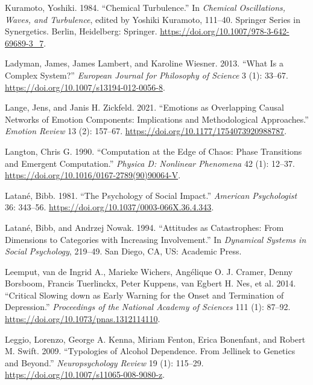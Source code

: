 \documentclass[
  a4paper,
  DIV=11,
  numbers=noendperiod,
  oneside]{scrreprt}
\newlength{\cslhangindent}
\newlength{\cslentryspacingunit} %
\newenvironment{CSLReferences}[2] %
 {%
  \setlength{\parindent}{0pt}
  \ifodd #1
  \let\oldpar\par
  \def\par{\hangindent=\cslhangindent\oldpar}
  \fi
  \setlength{\parskip}{#2\cslentryspacingunit}
 }%
 {}
\begin{document}
\begin{CSLReferences}{1}{0}
\leavevmode{}%
Kuramoto, Yoshiki. 1984. {``Chemical {Turbulence}.''} In \emph{Chemical
{Oscillations}, {Waves}, and {Turbulence}}, edited by Yoshiki Kuramoto,
111--40. Springer {Series} in {Synergetics}. {Berlin, Heidelberg}:
{Springer}. \url{https://doi.org/10.1007/978-3-642-69689-3_7}.

\leavevmode{}%
Ladyman, James, James Lambert, and Karoline Wiesner. 2013. {``What Is a
Complex System?''} \emph{European Journal for Philosophy of Science} 3
(1): 33--67. \url{https://doi.org/10.1007/s13194-012-0056-8}.

\leavevmode{}%
Lange, Jens, and Janis H. Zickfeld. 2021. {``Emotions as {Overlapping
Causal Networks} of {Emotion Components}: {Implications} and
{Methodological Approaches}.''} \emph{Emotion Review} 13 (2): 157--67.
\url{https://doi.org/10.1177/1754073920988787}.

\leavevmode{}%
Langton, Chris G. 1990. {``Computation at the Edge of Chaos: {Phase}
Transitions and Emergent Computation.''} \emph{Physica D: Nonlinear
Phenomena} 42 (1): 12--37.
\url{https://doi.org/10.1016/0167-2789(90)90064-V}.

\leavevmode{}%
Latané, Bibb. 1981. {``The Psychology of Social Impact.''}
\emph{American Psychologist} 36: 343--56.
\url{https://doi.org/10.1037/0003-066X.36.4.343}.

\leavevmode{}%
Latané, Bibb, and Andrzej Nowak. 1994. {``Attitudes as Catastrophes:
{From} Dimensions to Categories with Increasing Involvement.''} In
\emph{Dynamical Systems in Social Psychology}, 219--49. {San Diego, CA,
US}: {Academic Press}.

\leavevmode{}%
Leemput, van de Ingrid A., Marieke Wichers, Angélique O. J. Cramer,
Denny Borsboom, Francis Tuerlinckx, Peter Kuppens, van Egbert H. Nes, et
al. 2014. {``Critical Slowing down as Early Warning for the Onset and
Termination of Depression.''} \emph{Proceedings of the National Academy
of Sciences} 111 (1): 87--92.
\url{https://doi.org/10.1073/pnas.1312114110}.

\leavevmode{}%
Leggio, Lorenzo, George A. Kenna, Miriam Fenton, Erica Bonenfant, and
Robert M. Swift. 2009. {``Typologies of {Alcohol Dependence}. {From
Jellinek} to {Genetics} and {Beyond}.''} \emph{Neuropsychology Review}
19 (1): 115--29. \url{https://doi.org/10.1007/s11065-008-9080-z}.


\end{CSLReferences}
\end{document}
